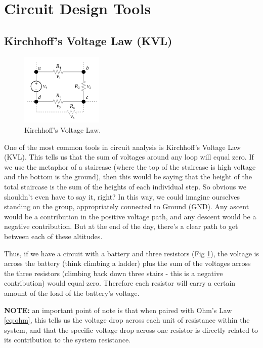 \documentclass[a4paper]{article}
\begin{document}
\section{Circuit Design Tools}
\subsection{Kirchhoff’s Voltage Law (KVL)}

\begin{figure}
  \begin{center}
    \includegraphics[width=0.35\textwidth]{kvl.png}
  \end{center}
  \caption{\label{fig:kvl}Kirchhoff’s Voltage Law.}
\end{figure}

One of the most common tools in circuit analysis is Kirchhoff’s Voltage Law (KVL). This tells us that the sum of voltages around any loop will equal zero. If we use the metaphor of a staircase (where the top of the staircase is high voltage and the bottom is the ground), then this would be saying that the height of the total staircase is the sum of the heights of each individual step. So obvious we shouldn't even have to say it, right? In this way, we could imagine ourselves standing on the group, appropriately connected to Ground (GND). Any ascent would be a contribution in the positive voltage path, and any descent would be a negative contribution. But at the end of the day, there's a clear path to get between each of these altitudes.

Thus, if we have a circuit with a battery and three resistors (Fig \ref{fig:kvl}), the voltage is across the battery (think climbing a ladder) plus the sum of the voltages across the three resistors (climbing back down three stairs - this is a negative contribution) would equal zero. Therefore each resistor will carry a certain amount of the load of the battery's voltage.

\vspace{0.5cm}
\noindent
\textbf{NOTE:} an important point of note is that when paired with Ohm's Law \eqref{eq:ohm}, this tells us the voltage drop across each unit of resistance within the system, and that the specific voltage drop across one resistor is directly related to its contribution to the system resistance.
\end{document}
